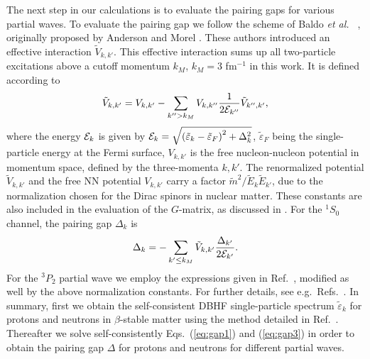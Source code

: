 The next step in our calculations is to evaluate the pairing gaps for
various partial waves.
To evaluate the pairing gap we follow 
the scheme
of Baldo {\em et al.\ } \cite{bcll90}, originally
proposed by Anderson and Morel \cite{am61}. 
These authors introduced an
effective interaction $\tilde{V}_{k,k'}$.
This effective interaction
sums up all two-particle excitations 
above a cutoff momentum $k_M$, $k_M=3$ fm$^{-1}$ in this work. 
It is defined according to
\begin{equation}
       \tilde{V}_{k,k'}=V_{k,k'}-\sum_{k''>k_M}V_{k,k''}
       \frac{1}{2{\cal E}_{k''}}
       \tilde{V}_{k'',k'},
       \label{eq:gap1}
\end{equation}
where the energy ${\cal E}_k$ is given by
${\cal E}_k =\sqrt{\left(\tilde{\varepsilon}_k-
\tilde{\varepsilon}_F\right)^2+\Delta_k^2}$,
$\tilde{\varepsilon}_F$ being the single-particle energy at the Fermi surface,
$V_{k,k'}$ is the free nucleon-nucleon potential in momentum space, defined
by the three-momenta $k,k'$. 
The renormalized potential $\tilde{V}_{k,k'}$ and the free NN potential
$V_{k,k'}$ carry a factor $\tilde{m}^2/\tilde{E}_k\tilde{E}_{k'}$,
due to the normalization chosen for the Dirac spinors in nuclear matter.
These
constants are also included in the evaluation of the $G$-matrix,
as discussed in \cite{bm90,hko95}. 
For the $^1S_0$ channel, the pairing gap
$\Delta_k$ is \cite{bcll90,am61,kr90} 
\begin{equation}
       \Delta_k=-\sum_{k'\leq k_M}\tilde{V}_{k,k'}
       \frac{\Delta_{k'}}{2{\cal E}_{k'}}.
       \label{eq:gap3}
\end{equation}
For the $^3P_2$ partial wave we employ the expressions
given in Ref.\ \cite{eeho96a}, modified as well 
by the above normalization
constants. 
For further details, see e.g.\ Refs.\ \cite{bcll90,eeho96a,eeho96b}.
In summary, first we obtain the self-consistent 
DBHF single-particle spectrum $\tilde{\varepsilon}_k$ 
for protons and neutrons
in $\beta$-stable matter using the method
detailed in Ref.\ \cite{eeho96b}. 
Thereafter we solve self-consistently Eqs.\ (\ref{eq:gap1}) and
(\ref{eq:gap3}) in order to obtain the pairing gap
$\Delta$ for protons and neutrons for different partial waves.

